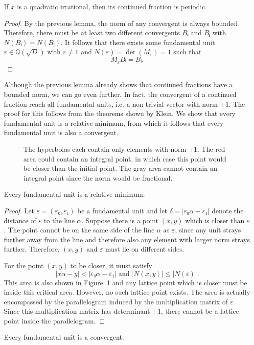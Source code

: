 \begin{theorem}
  If $x$ is a quadratic irrational,
  then its continued fraction is periodic.
\end{theorem}

\begin{proof}
  By the previous lemma, the norm of any convergent is always bounded.
  Therefore, there must be at least two different convergents $Bᵢ$ and $Bⱼ$ with $N(Bᵢ) = N(Bⱼ)$.
  It follows that there exists some fundamental unit $ε ∈ ℚ(\sqrt{D})$ with $ε
  ≠ 1$ and $N(ε) = \det(M_ε) = 1$ such that
  \[
    M_ε Bᵢ = Bⱼ.
  \]
\end{proof}

Although the previous lemma already shows that continued fractions have a bounded norm,
we can go even further.
In fact, the convergent of a continued fraction reach all fundamental
units, i.e. a non-trivial vector with norm $±1$.
The proof for this follows from the theorems shown by Klein.
We show that every fundamental unit is a relative minimum,
from which it follows that every fundamental unit is also a convergent.

\begin{figure}[tb]
  \centering
  
  \caption{
    The hyperbolas each contain only elements with norm $±1$.
    The red area could contain an integral point, in which case this point
    would be closer than the initial point.
    The gray area cannot contain an integral point since the norm would be
    fractional.
  }
  \label{fig:critical-section}
\end{figure}

\begin{proposition}
  Every fundamental unit is a relative minimum.
\end{proposition}

\begin{proof}
  Let $ε = (ε₀, ε₁)$ be a fundamental unit and let $δ = |ε₀ α - ε₁|$ denote the
  distance of $ε$ to the line $α$.
  Suppose there is a point $(x, y)$ which is closer than $ε$.
  The point cannot be on the same side of the line $α$ as $ε$,
  since any unit strays further away from the line
  and therefore also any element with larger norm strays further.
  Therefore, $(x, y)$ and $ε$ must lie on different sides.

  For the point $(x, y)$ to be closer, it must satisfy
  \[
    |x α - y| < |ε₀ α - ε₁| \text{ and } |N(x, y)| ≤ |N(ε)|.
  \]
  This area is also shown in Figure~\ref{fig:critical-section}
  and any lattice point which is closer must be inside this critical area.
  However, no such lattice point exists.
  The area is actually encompassed by the parallelogram induced by the
  multiplication matrix of $ε$.
  Since this multiplication matrix has determinant $±1$, there cannot be a
  lattice point inside the parallelogram.
\end{proof}

\begin{corollary}
  Every fundamental unit is a convergent.
\end{corollary}
